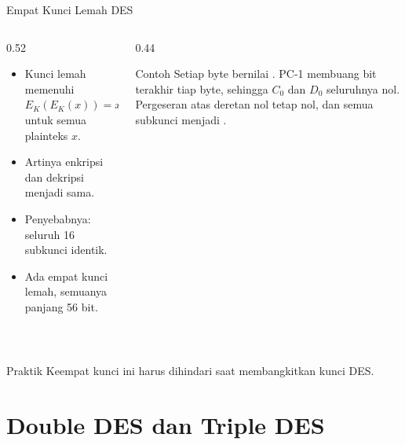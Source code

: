 \documentclass[aspectratio=169,11pt]{beamer}
\begin{document}
\begin{frame}{Empat Kunci Lemah DES}
    \begin{columns}[T,onlytextwidth]
        \begin{column}{0.52\textwidth}
            \footnotesize
            \begin{itemize}
                \item Kunci lemah memenuhi $E_K(E_K(x))=x$ untuk semua
                      plainteks $x$.
                \item Artinya enkripsi dan dekripsi menjadi sama.
                \item Penyebabnya: seluruh 16 subkunci identik.
                \item Ada empat kunci lemah, semuanya panjang 56 bit.
            \end{itemize}
        \end{column}
        \begin{column}{0.44\textwidth}
            \begin{block}{Contoh }
                \footnotesize
                Setiap byte bernilai . PC-1 membuang bit
                terakhir tiap byte, sehingga $C_0$ dan $D_0$ seluruhnya
                nol. Pergeseran atas deretan nol tetap nol, dan semua
                subkunci menjadi .
            \end{block}
        \end{column}
    \end{columns}
    \vspace{0.15cm}
    \begin{center}
        \small
         \quad
         \\
        \vspace{2pt}
         \quad
    \end{center}
    \begin{alertblock}{Praktik}
        \footnotesize
        Keempat kunci ini harus dihindari saat membangkitkan kunci DES.
    \end{alertblock}
\end{frame}

\section{Double DES dan Triple DES}
\end{document}
